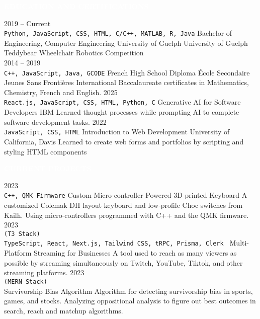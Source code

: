 \documentclass[9pt]{src/developercv} %
\begin{document}
\colorbox{sky800}{\textcolor{white}{\LARGE\MakeUppercase{\textbf{Education and Certifications}}}}\\%
\begin{entrylist}
	\entry
		{2019 -- Current\\
		\small{\texttt{Python, JavaScript, CSS, HTML, C/C++, MATLAB, R, Java}}\hfill}
		{Bachelor of Engineering, Computer Engineering}
		{University of Guelph}
		{University of Guelph Teddybear Wheelchair Robotics Competition\hfill\\}
	\entry
		{2014 -- 2019\\
		\small{\texttt{C++, JavaScript, Java, GCODE}}\hfill}
		{French High School Diploma}
		{École Secondaire Jeunes Sans Frontières}
		{International Baccalaureate certificates in Mathematics, Chemistry, French and English.}
	\entry
		{2025\\
		\small{\texttt{React.js, JavaScript, CSS, HTML, Python, C}}\hfill}
		{Generative AI for Software Developers}
		{IBM}
		{Learned thought processes while prompting AI to complete software development tasks.}
	\entry
		{2022\\
		\small{\texttt{JavaScript, CSS, HTML}}\hfill}
		{Introduction to Web Development}
		{University of California, Davis}
		{Learned to create web forms and portfolios by scripting and styling HTML components}
\end{entrylist}

\colorbox{sky700}{\textcolor{white}{\LARGE\MakeUppercase{\textbf{Current Projects}}}}\\%
\begin{entrylist}
	\entry
		{2023\\
		\small{\texttt{C++, QMK Firmware}}}
		{Custom Micro-controller Powered 3D printed Keyboard}
		{}
		{A customized Colemak DH layout keyboard and low-profile Choc switches from Kailh. Using micro-controllers programmed with C++ and the QMK firmware.}
	\entry
		{2023\\
		\small{\texttt{(T3 Stack)\\TypeScript, React, Next.js, Tailwind CSS, tRPC, Prisma, Clerk }}}
		{Multi-Platform Streaming for Businesses}
		{}
		{A tool used to reach as many viewers as possible by streaming simultaneously on Twitch, YouTube, Tiktok, and other streaming platforms.}
	\entry
		{2023\\
		\small{\texttt{(MERN Stack)\\ }}}
		{Survivorship Bias Algorithm}
		{}
		{Algorithm for detecting survivorship bias in sports, games, and stocks. Analyzing oppositional analysis to figure out best outcomes in search, reach and matchup algorithms.}
\end{entrylist}
\end{document}
